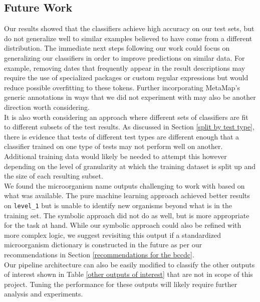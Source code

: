\documentclass[11pt]{article}
\begin{document}
\subsection{Future Work} \label{future work}

Our results showed that the classifiers achieve high accuracy on our test sets, but do not generalize well to similar examples believed to have come from a different distribution. The immediate next steps following our work could focus on generalizing our classifiers in order to improve predictions on similar data. For example, removing dates that frequently appear in the result descriptions may require the use of specialized packages or custom regular expressions but would reduce possible overfitting to these tokens. Further incorporating MetaMap's generic annotations in ways that we did not experiment with may also be another direction worth considering.
\\

It is also worth considering an approach where different sets of classifiers are fit to different subsets of the test results. As discussed in Section \ref{split by test type}, there is evidence that tests of different test types are different enough that a classifier trained on one type of tests may not perform well on another. Additional training data would likely be needed to attempt this however depending on the level of granularity at which the training dataset is split up and the size of each resulting subset.
\\

We found the microorganism name outputs challenging to work with based on what was available. The pure machine learning approach achieved better results on \verb|level_1| but is unable to identify new organisms beyond what is in the training set. The symbolic approach did not do as well, but is more appropriate for the task at hand. While our symbolic approach could also be refined with more complex logic, we suggest revisiting this output if a standardized microorganism dictionary is constructed in the future as per our recommendations in Section \ref{recommendations for the bccdc}.
\\

Our pipeline architecture can also be easily modified to classify the other outputs of interest shown in Table \ref{other outputs of interest} that are not in scope of this project. Tuning the performance for these outputs will likely require further analysis and experiments.
\\
\end{document}
